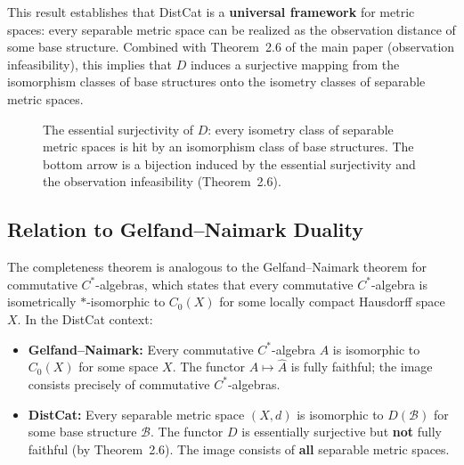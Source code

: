 \documentclass[11pt,a4paper]{article}
\begin{document}
This result establishes that DistCat is a \textbf{universal framework} for
metric spaces: every separable metric space can be realized as the observation
distance of some base structure. Combined with Theorem~2.6 of the main paper
(observation infeasibility), this implies that $D$ induces a surjective
mapping from the isomorphism classes of base structures onto the
isometry classes of separable metric spaces.

\begin{figure}[t]
\centering
{}
\caption{The essential surjectivity of $D$: every isometry class of
separable metric spaces is hit by an isomorphism class of base structures.
The bottom arrow is a bijection induced by the essential surjectivity
and the observation infeasibility (Theorem~2.6).}
\label{fig:completeness-diagram}
\end{figure}

\subsection{Relation to Gelfand--Naimark Duality}

The completeness theorem is analogous to the Gelfand--Naimark theorem for
commutative $C^*$-algebras, which states that every commutative $C^*$-algebra
is isometrically $*$-isomorphic to $C_0(X)$ for some locally compact
Hausdorff space $X$. In the DistCat context:

\begin{itemize}
\item \textbf{Gelfand--Naimark:} Every commutative $C^*$-algebra $A$ is
isomorphic to $C_0(X)$ for some space $X$. The functor $A\mapsto\widehat{A}$
is fully faithful; the image consists precisely of commutative $C^*$-algebras.
\item \textbf{DistCat:} Every separable metric space $(X,d)$ is isomorphic
to $D(\mathcal{B})$ for some base structure $\mathcal{B}$. The functor
$D$ is essentially surjective but \textbf{not} fully faithful (by
Theorem~2.6). The image consists of \textbf{all} separable metric spaces.
\end{itemize}
\end{document}
